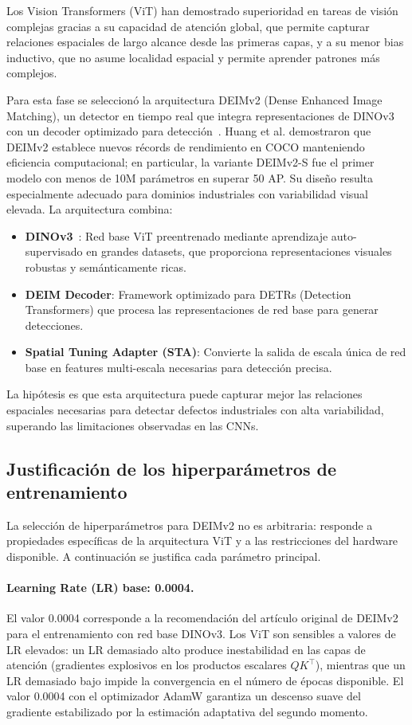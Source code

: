 Los Vision Transformers (\acrshort{ViT}) han demostrado superioridad en tareas de visión complejas gracias a su capacidad de atención global, que permite capturar relaciones espaciales de largo alcance desde las primeras capas, y a su menor bias inductivo, que no asume localidad espacial y permite aprender patrones más complejos.

Para esta fase se seleccionó la arquitectura DEIMv2 (Dense Enhanced Image Matching), un detector en tiempo real que integra representaciones de DINOv3 con un decoder optimizado para detección~\cite{huang2025deimv2}. Huang et al. demostraron que DEIMv2 establece nuevos récords de rendimiento en COCO manteniendo eficiencia computacional; en particular, la variante DEIMv2-S fue el primer modelo con menos de 10M parámetros en superar 50 AP. Su diseño resulta especialmente adecuado para dominios industriales con variabilidad visual elevada. La arquitectura combina:
\begin{itemize}
    \item \textbf{DINOv3}~\cite{simeoni2025dinov3}: Red base \acrshort{ViT} preentrenado mediante aprendizaje auto-supervisado en grandes datasets, que proporciona representaciones visuales robustas y semánticamente ricas.
    \item \textbf{DEIM Decoder}: Framework optimizado para DETRs (Detection Transformers) que procesa las representaciones de red base para generar detecciones.
    \item \textbf{Spatial Tuning Adapter (STA)}: Convierte la salida de escala única de red base en features multi-escala necesarias para detección precisa.
\end{itemize}

La hipótesis es que esta arquitectura puede capturar mejor las relaciones espaciales necesarias para detectar defectos industriales con alta variabilidad, superando las limitaciones observadas en las CNNs.

\subsection{Justificación de los hiperparámetros de entrenamiento}
\label{subsec:justificacion_hiperparametros}

La selección de hiperparámetros para DEIMv2 no es arbitraria: responde a propiedades específicas de la arquitectura ViT y a las restricciones del hardware disponible. A continuación se justifica cada parámetro principal.

\paragraph{Learning Rate (LR) base: 0.0004.}
El valor 0.0004 corresponde a la recomendación del artículo original de DEIMv2~\cite{huang2025deimv2} para el entrenamiento con red base DINOv3. Los ViT son sensibles a valores de LR elevados: un LR demasiado alto produce inestabilidad en las capas de atención (gradientes explosivos en los productos escalares $QK^\top$), mientras que un LR demasiado bajo impide la convergencia en el número de épocas disponible. El valor 0.0004 con el optimizador AdamW garantiza un descenso suave del gradiente estabilizado por la estimación adaptativa del segundo momento.

